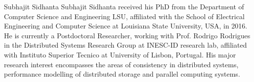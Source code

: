 \documentclass[journal,compsoc]{IEEEtran}
\begin{document}
%   
\begin{IEEEbiography}{Subhajit Sidhanta}
Subhajit Sidhanta received his PhD from the Department of Computer Science and Engineering
LSU, affiliated with the School of Electrical Engineering and Computer Science at Louisiana State University, USA, in 2016. He is currently a Postdoctoral Researcher, working with Prof. Rodrigo Rodrigues in the Distributed Systems Research Group at INESC-ID research lab, affiliated with Instituto Superior Tecnico at University of Lisbon, Portugal. His major research interest encompasses the areas of consistency in distributed systems, performance modelling of distributed storage and parallel computing systems.
\end{IEEEbiography}
\end{document}
